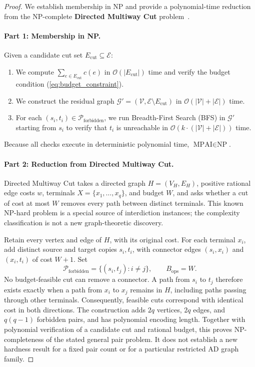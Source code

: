 \begin{proof}
We establish membership in NP and provide a polynomial-time reduction from the NP-complete \textbf{Directed Multiway Cut} problem~\cite{garg1994multiway}.

\paragraph{Part 1: Membership in NP.}
Given a candidate cut set $E_{\text{cut}} \subseteq \mathcal{E}$:
\begin{enumerate}
    \item We compute $\sum_{e \in E_{\text{cut}}} c(e)$ in $\mathcal{O}(|E_{\text{cut}}|)$ time and verify the budget condition (\ref{eq:budget_constraint}).
    \item We construct the residual graph $\mathcal{G}' = (\mathcal{V}, \mathcal{E} \setminus E_{\text{cut}})$ in $\mathcal{O}(|\mathcal{V}| + |\mathcal{E}|)$ time.
    \item For each $(s_i, t_i) \in \mathcal{P}_{\text{forbidden}}$, we run Breadth-First Search (BFS) in $\mathcal{G}'$ starting from $s_i$ to verify that $t_i$ is unreachable in $\mathcal{O}(k \cdot (|\mathcal{V}| + |\mathcal{E}|))$ time.
\end{enumerate}
Because all checks execute in deterministic polynomial time, $\text{MPAI} \in \text{NP}$.

\paragraph{Part 2: Reduction from Directed Multiway Cut.}
Directed Multiway Cut takes a directed graph $H=(V_H,E_H)$, positive rational edge costs $w$, terminals $X=\{x_1,\ldots,x_q\}$, and budget $W$, and asks whether a cut of cost at most $W$ removes every path between distinct terminals. This known NP-hard problem is a special source of interdiction instances; the complexity classification is not a new graph-theoretic discovery.

Retain every vertex and edge of $H$, with its original cost. For each terminal $x_i$, add distinct source and target copies $s_i,t_i$, with connector edges $(s_i,x_i)$ and $(x_i,t_i)$ of cost $W+1$. Set
\begin{equation}
\mathcal{P}_{\mathrm{forbidden}}=\{(s_i,t_j):i\ne j\},\qquad B_{\mathrm{ops}}=W.
\end{equation}
No budget-feasible cut can remove a connector. A path from $s_i$ to $t_j$ therefore exists exactly when a path from $x_i$ to $x_j$ remains in $H$, including paths passing through other terminals. Consequently, feasible cuts correspond with identical cost in both directions. The construction adds $2q$ vertices, $2q$ edges, and $q(q-1)$ forbidden pairs, and has polynomial encoding length. Together with polynomial verification of a candidate cut and rational budget, this proves NP-completeness of the stated general pair problem. It does not establish a new hardness result for a fixed pair count or for a particular restricted AD graph family.
\end{proof}

